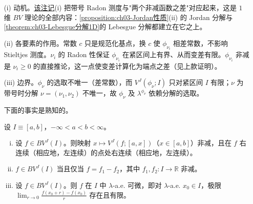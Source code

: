 \documentclass[../../main.tex]{subfiles}%
\begin{document}
\begin{remark}\label{remark:ch03-Stieltjes动机}
(i) 动机。\hyperref[remark:ch03-Stieltjes]{该注记}(i) 把带号 Radon 测度与"两个非减函数之差"对应起来，这是 $1$ 维 $BV$ 理论的全部内容：\cref{proposition:ch03-Jordan性质}(ii) 的 Jordan 分解与\cref{theorem:ch03-Lebesgue分解1D}的 Lebesgue 分解都建立在它之上。

(ii) 各要素的作用。常数 $c$ 只是规范化基点，换 $c$ 使 $\phi_{\nu_i}$ 相差常数，不影响 Stieltjes 测度。$\nu_i$ 的 Radon 性保证 $\phi_{\nu_i}$ 在紧区间上有界、从而变差有限。$\phi_{\nu_i}$ 非减是 $\nu_i\geqslant0$ 的直接推论，这一点使变差计算化为端点之差（见上款证明）。

(iii) 边界。$\phi_\nu$ 的选取不唯一（差常数），而 $V^J(\phi_\nu;I)$ 只对紧区间 $I$ 有限；$\nu$ 为带号时分解 $\nu=(\nu_1,\nu_2)$ 不唯一，故 $\phi_\nu$ 及 $\lambda^{\phi_\nu}$ 依赖分解的选取。
\end{remark}

下面的事实是熟知的。

\begin{proposition}\label{proposition:ch03-Jordan性质}
设 $I\equiv[a,b]$，$-\infty<a<b<\infty$。
\begin{enumerate}[(i)]
\item 设 $f\in BV^J(I)$。则映射 $x\mapsto V^J(f;[a,x])$（$x\in[a,b]$）非减，且在 $f$ 右连续（相应地，左连续）的点处右连续（相应地，左连续）。
\item $f\in BV^J(I)$ 当且仅当 $f=f_1-f_2$，其中 $f_1,f_2:I\to\mathbb{R}$ 非减。
\item 设 $f\in BV^J(I)$。则 $f$ 在 $I$ 中 $\lambda$-a.e. 可微，即对 $\lambda$-a.e. $x_0\in I$，极限 $\lim_{r\to0}\frac{f(x_0+r)-f(x_0)}{r}$ 存在且有限。
\end{enumerate}
\end{proposition}
\end{document}
